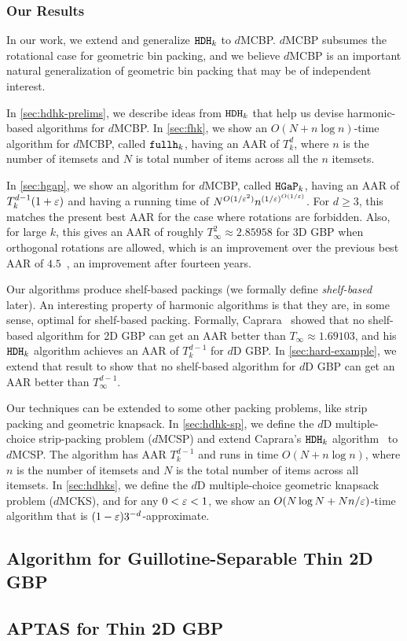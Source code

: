 \subsubsection{Our Results}

In our work, we extend and generalize $\operatorname{\mathtt{HDH}}_{k}$ to $d$MCBP.
$d$MCBP subsumes the rotational case for geometric bin packing,
and we believe $d$MCBP is an important natural generalization
of geometric bin packing that may be of independent interest.

In \cref{sec:hdhk-prelims}, we describe ideas from $\operatorname{\mathtt{HDH}}_{k}$
that help us devise harmonic-based algorithms for $d$MCBP.
In \cref{sec:fhk}, we show an $O(N + n\log n)$-time algorithm for $d$MCBP,
called $\operatorname{\mathtt{fullh}}_k$, having an AAR of $T_k^d$, where $n$ is the number of itemsets
and $N$ is total number of items across all the $n$ itemsets.

In \cref{sec:hgap}, we show an algorithm for $d$MCBP, called $\operatorname{\mathtt{HGaP}}_k$, having an AAR of
$T_k^{d-1}(1+\varepsilon)$ and having a running time of $N^{O(1/\varepsilon^2)}n^{(1/\varepsilon)^{O(1/\varepsilon)}}$.
For $d \ge 3$, this matches the present best AAR for the case
where rotations are forbidden.
Also, for large $k$, this gives an AAR of roughly $T_{\infty}^2 \approx 2.85958$
for 3D GBP when orthogonal rotations are allowed,
which is an improvement over the previous best AAR of $4.5$~\cite{epstein2006side},
an improvement after fourteen years.

\begin{optional}
Our algorithms produce shelf-based packings (we formally define \emph{shelf-based} later).
An interesting property of harmonic algorithms is that they are,
in some sense, optimal for shelf-based packing. Formally,
Caprara~\cite{caprara2008} showed that no shelf-based algorithm for 2D GBP can get an AAR
better than $T_{\infty} \approx 1.69103$,
and his $\operatorname{\mathtt{HDH}}_{k}$ algorithm achieves an AAR of $T_k^{d-1}$ for $d$D GBP.
In \cref{sec:hard-example}, we extend that result to show that no shelf-based algorithm
for $d$D GBP can get an AAR better than $T_{\infty}^{d-1}$.%
\end{optional}

Our techniques can be extended to some other packing problems,
like strip packing and geometric knapsack.
In \cref{sec:hdhk-sp}, we define the $d$D multiple-choice strip-packing problem ($d$MCSP)
and extend Caprara's $\operatorname{\mathtt{HDH}}_{k}$ algorithm~\cite{caprara2008} to $d$MCSP.
The algorithm has AAR $T_k^{d-1}$ and runs in time $O(N + n\log n)$,
where $n$ is the number of itemsets and $N$ is the total number of items across all itemsets.
In \cref{sec:hdhks}, we define the $d$D multiple-choice geometric knapsack problem ($d$MCKS),
and for any $0 < \varepsilon < 1$, we show an $O(N\log N + Nn/\varepsilon)$-time algorithm
that is $(1-\varepsilon)3^{-d}$-approximate.

\subsection{Algorithm for Guillotine-Separable Thin 2D GBP}

\subsection{APTAS for Thin 2D GBP}
